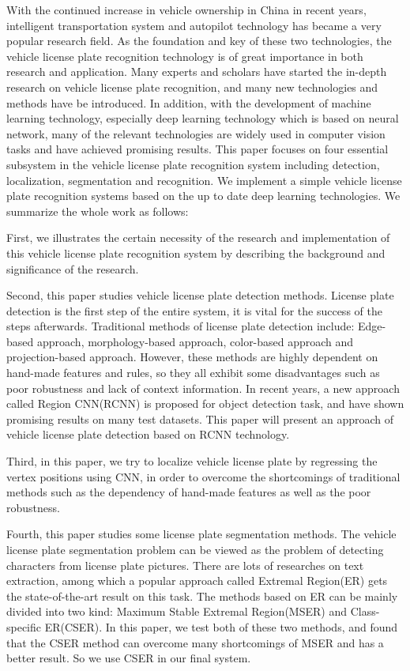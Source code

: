 \begin{enabstract}
With the continued increase in vehicle ownership in China in recent years,
intelligent transportation system and autopilot technology has became a very
popular research field. As the foundation and key of these two technologies,
the vehicle license plate recognition technology is of great importance in both
research and application. Many experts and scholars have started the in-depth
research on vehicle license plate recognition, and many new technologies and
methods have be introduced. In addition, with the development of machine
learning technology, especially deep learning technology which is based on
neural network, many of the relevant technologies are widely used in computer
vision tasks and have achieved promising results. This paper focuses on four
essential subsystem in the vehicle license plate recognition system including
detection, localization, segmentation and recognition. We implement a simple vehicle
license plate recognition systems based on the up to date deep learning
technologies. We summarize the whole work as follows:

First, we illustrates the certain necessity of the research and implementation
of this vehicle license plate recognition system by describing the background and
significance of the research.

Second, this paper studies vehicle license plate detection methods.
License plate detection is the first step of the entire system, it is vital for
the success of the steps afterwards. Traditional methods of
license plate detection include: Edge-based approach, morphology-based
approach, color-based approach and projection-based approach. However, these methods
are highly dependent on hand-made features and rules, so they all exhibit some
disadvantages such as poor robustness and lack of context information. In recent
years, a new approach called Region CNN(RCNN) is proposed for object detection
task, and have shown promising results on many test datasets. This paper will
present an approach of vehicle license plate detection based on RCNN
technology.

Third, in this paper, we try to localize vehicle license plate by regressing the
vertex positions using CNN, in order to overcome the shortcomings of traditional
methods such as the dependency of hand-made features as well as the
poor robustness.

Fourth, this paper studies some license plate segmentation methods. The vehicle
license plate segmentation problem can be viewed as the problem of detecting
characters from license plate pictures. There are lots of researches on text
extraction, among which a popular approach called Extremal Region(ER)
gets the state-of-the-art result on this task. The methods based on ER can be mainly
divided into two kind: Maximum Stable Extremal Region(MSER) and Class-specific
ER(CSER). In this paper, we test both of these two methods, and found that
the CSER method can overcome many shortcomings of MSER and has a better result.
So we use CSER in our final system.


\end{enabstract}

